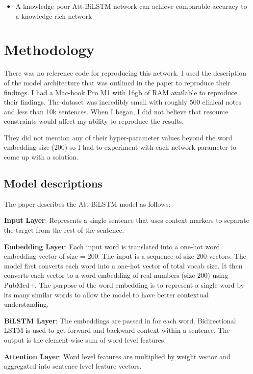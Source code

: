 \documentclass[11pt,a4paper]{article}
\begin{document}
\begin{itemize}
    \item A knowledge poor Att-BiLSTM network can achieve comparable accuracy to a knowledge rich network
\end{itemize}


\section{Methodology}

There was no reference code for reproducing this network. I used the description of the model architecture that was outlined in the paper to reproduce their findings. I had a Mac-book Pro M1 with 16gb of RAM available to reproduce their findings. The dataset was incredibly small with roughly 500 clinical notes and less than 10k sentences. When I began, I did not believe that resource constraints would affect my ability to reproduce the results.

They did not mention any of their hyper-parameter values beyond the word embedding size (200) so I had to experiment with each network parameter to come up with a solution.

\subsection{Model descriptions}
The paper describes the Att-BiLSTM model as follows:

\textbf{Input Layer}: Represents a single sentence that uses context markers to separate the target from the rest of the sentence.

\textbf{Embedding Layer}: Each input word is translated into a one-hot word embedding vector of size = 200. The input is a sequence of size 200 vectors. The model first converts each word into a one-hot vector of total vocab size. It then converts each vector to a word embedding of real numbers (size 200) using PubMed+. The purpose of the word embedding is to represent a single word by its many similar words to allow the model to have better contextual understanding.

\textbf{BiLSTM Layer}: The embeddings are passed in for each word. Bidirectional LSTM is used to get forward and backward context within a sentence. The output is the element-wise sum of word level features.

\textbf{Attention Layer}: Word level features are multiplied by weight vector and aggregated into sentence level feature vectors.
\end{document}

